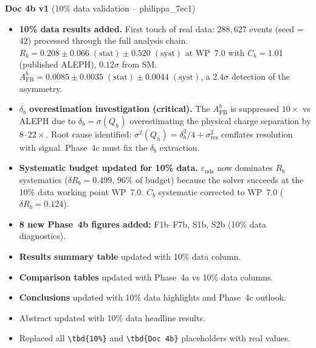 \documentclass[11pt,a4paper]{article}
\begin{document}
\textbf{Doc 4b v1} (10\% data validation -- philippa\_7ec1)
\begin{itemize}
\item \textbf{10\% data results added.} First touch of real data: $288{,}627$ events
  (seed = 42) processed through the full analysis chain. $R_b = 0.208 \pm 0.066\;\mathrm{(stat)}
  \pm 0.520\;\mathrm{(syst)}$ at WP~7.0 with $C_b = 1.01$ (published ALEPH),
  $0.12\sigma$ from SM. $A_\mathrm{FB}^b = 0.0085 \pm 0.0035\;\mathrm{(stat)}
  \pm 0.0044\;\mathrm{(syst)}$, a $2.4\sigma$ detection of the asymmetry.
\item \textbf{$\delta_b$ overestimation investigation (critical).} The $A_\mathrm{FB}^b$
  is suppressed $10\times$ vs ALEPH due to $\delta_b = \sigma(Q_h)$ overestimating the
  physical charge separation by $8$--$22\times$. Root cause identified:
  $\sigma^2(Q_h) = \delta_b^2/4 + \sigma_\mathrm{res}^2$ conflates resolution with
  signal. Phase~4c must fix the $\delta_b$ extraction.
\item \textbf{Systematic budget updated for 10\% data.} $\varepsilon_\mathrm{uds}$
  now dominates $R_b$ systematics ($\delta R_b = 0.499$, 96\% of budget) because
  the solver succeeds at the 10\% data working point WP~7.0. $C_b$ systematic
  corrected to WP~7.0 ($\delta R_b = 0.124$).
\item \textbf{8 new Phase~4b figures added:} F1b--F7b, S1b, S2b (10\% data diagnostics).
\item \textbf{Results summary table} updated with 10\% data column.
\item \textbf{Comparison tables} updated with Phase~4a vs 10\% data columns.
\item \textbf{Conclusions} updated with 10\% data highlights and Phase~4c outlook.
\item Abstract updated with 10\% data headline results.
\item Replaced all \texttt{\textbackslash tbd\{10\%\}} and \texttt{\textbackslash tbd\{Doc 4b\}}
  placeholders with real values.
\end{itemize}
\end{document}
